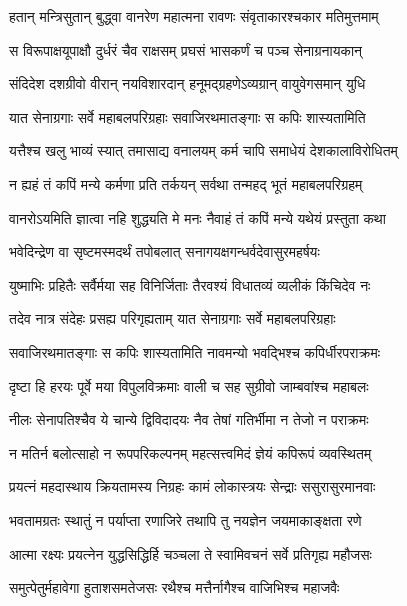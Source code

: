 
\twolineshloka
{हतान् मन्त्रिसुतान् बुद्ध्वा वानरेण महात्मना}
{रावणः संवृताकारश्चकार मतिमुत्तमाम्} %

\twolineshloka
{स विरूपाक्षयूपाक्षौ दुर्धरं चैव राक्षसम्}
{प्रघसं भासकर्णं च पञ्च सेनाग्रनायकान्} %

\twolineshloka
{संदिदेश दशग्रीवो वीरान् नयविशारदान्}
{हनूमद्ग्रहणेऽव्यग्रान् वायुवेगसमान् युधि} %

\twolineshloka
{यात सेनाग्रगाः सर्वे महाबलपरिग्रहाः}
{सवाजिरथमातङ्गाः स कपिः शास्यतामिति} %

\twolineshloka
{यत्तैश्च खलु भाव्यं स्यात् तमासाद्य वनालयम्}
{कर्म चापि समाधेयं देशकालाविरोधितम्} %

\twolineshloka
{न ह्यहं तं कपिं मन्ये कर्मणा प्रति तर्कयन्}
{सर्वथा तन्महद् भूतं महाबलपरिग्रहम्} %

\twolineshloka
{वानरोऽयमिति ज्ञात्वा नहि शुद्ध्यति मे मनः}
{नैवाहं तं कपिं मन्ये यथेयं प्रस्तुता कथा} %

\twolineshloka
{भवेदिन्द्रेण वा सृष्टमस्मदर्थं तपोबलात्}
{सनागयक्षगन्धर्वदेवासुरमहर्षयः} %

\twolineshloka
{युष्माभिः प्रहितैः सर्वैर्मया सह विनिर्जिताः}
{तैरवश्यं विधातव्यं व्यलीकं किंचिदेव नः} %

\twolineshloka
{तदेव नात्र संदेहः प्रसह्य परिगृह्यताम्}
{यात सेनाग्रगाः सर्वे महाबलपरिग्रहाः} %

\twolineshloka
{सवाजिरथमातङ्गाः स कपिः शास्यतामिति}
{नावमन्यो भवद्भिश्च कपिर्धीरपराक्रमः} %

\twolineshloka
{दृष्टा हि हरयः पूर्वे मया विपुलविक्रमाः}
{वाली च सह सुग्रीवो जाम्बवांश्च महाबलः} %

\twolineshloka
{नीलः सेनापतिश्चैव ये चान्ये द्विविदादयः}
{नैव तेषां गतिर्भीमा न तेजो न पराक्रमः} %

\twolineshloka
{न मतिर्न बलोत्साहो न रूपपरिकल्पनम्}
{महत्सत्त्वमिदं ज्ञेयं कपिरूपं व्यवस्थितम्} %

\twolineshloka
{प्रयत्नं महदास्थाय क्रियतामस्य निग्रहः}
{कामं लोकास्त्रयः सेन्द्राः ससुरासुरमानवाः} %

\twolineshloka
{भवतामग्रतः स्थातुं न पर्याप्ता रणाजिरे}
{तथापि तु नयज्ञेन जयमाकाङ्क्षता रणे} %

\twolineshloka
{आत्मा रक्ष्यः प्रयत्नेन युद्धसिद्धिर्हि चञ्चला}
{ते स्वामिवचनं सर्वे प्रतिगृह्य महौजसः} %

\twolineshloka
{समुत्पेतुर्महावेगा हुताशसमतेजसः}
{रथैश्च मत्तैर्नागैश्च वाजिभिश्च महाजवैः} %

